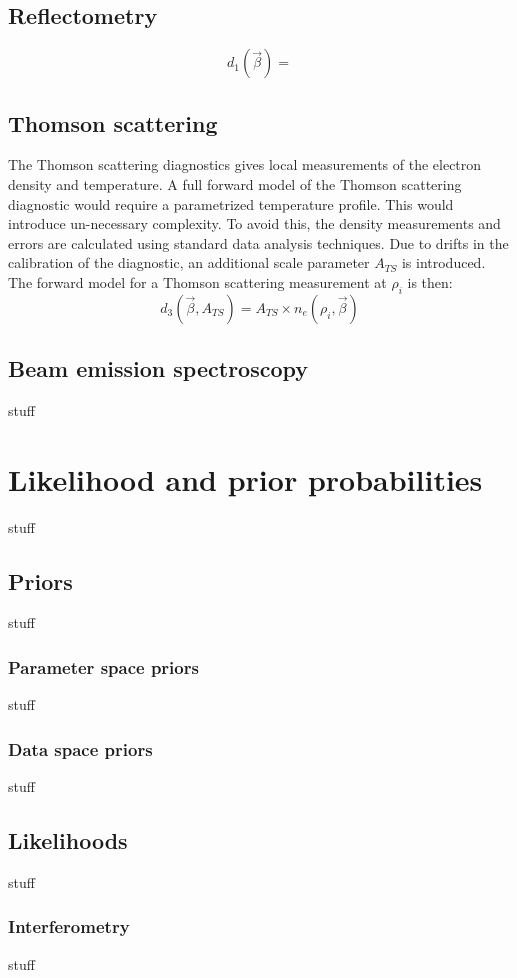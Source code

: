 \documentclass[12pt]{article}
\numberwithin{equation}{section}
\begin{document}
\subsection{Reflectometry}
\begin{equation} \label{eq:refl_model}
	d_1(\vec{\beta})= 
\end{equation}
\subsection{Thomson scattering}
The Thomson scattering diagnostics gives local measurements of the electron density and temperature. A full forward model of the Thomson scattering diagnostic would require a parametrized temperature profile. This would introduce un-necessary complexity. To avoid this, the density measurements and errors are calculated using standard data analysis techniques. Due to drifts in the calibration of the diagnostic, an additional scale parameter $A_{TS}$ is introduced. The forward model for a Thomson scattering measurement at $\rho_i$ is then:
\begin{equation} \label{eq:thom_model}
	d_3(\vec{\beta},A_{TS}) = A_{TS} \times n_{e}(\rho_i,\vec{\beta})
\end{equation}
\subsection{Beam emission spectroscopy}
stuff
\section{Likelihood and prior probabilities}
stuff
\subsection{Priors}
stuff
\subsubsection{Parameter space priors}
stuff
\subsubsection{Data space priors}
stuff
\subsection{Likelihoods}
stuff
\subsubsection{Interferometry}
stuff
\end{document}

